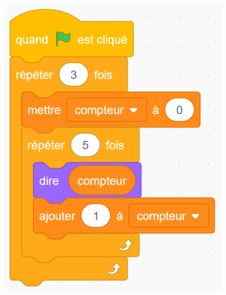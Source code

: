 \documentclass[14pt]{extarticle}
\begin{document}
\begin{figure}[H]
    \centering
    \includegraphics[width=0.5\linewidth]{images/pretest/_Q8.png}
\end{figure}
\end{document}
